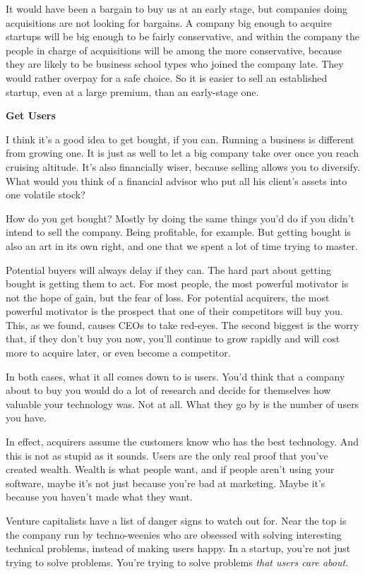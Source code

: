 \documentclass[12pt]{book}
\begin{document}
It would have been a bargain to buy us at an early stage, but companies
doing acquisitions are not looking for bargains. A company big enough to
acquire startups will be big enough to be fairly conservative, and
within the company the people in charge of acquisitions will be among
the more conservative, because they are likely to be business school
types who joined the company late. They would rather overpay for a safe
choice. So it is easier to sell an established startup, even at a large
premium, than an early-stage one.

\textbf{Get Users}

I think it's a good idea to get bought, if you can. Running a business
is different from growing one. It is just as well to let a big company
take over once you reach cruising altitude. It's also financially wiser,
because selling allows you to diversify. What would you think of a
financial advisor who put all his client's assets into one volatile
stock?

How do you get bought? Mostly by doing the same things you'd do if you
didn't intend to sell the company. Being profitable, for example. But
getting bought is also an art in its own right, and one that we spent a
lot of time trying to master.

Potential buyers will always delay if they can. The hard part about
getting bought is getting them to act. For most people, the most
powerful motivator is not the hope of gain, but the fear of loss. For
potential acquirers, the most powerful motivator is the prospect that
one of their competitors will buy you. This, as we found, causes CEOs to
take red-eyes. The second biggest is the worry that, if they don't buy
you now, you'll continue to grow rapidly and will cost more to acquire
later, or even become a competitor.

In both cases, what it all comes down to is users. You'd think that a
company about to buy you would do a lot of research and decide for
themselves how valuable your technology was. Not at all. What they go by
is the number of users you have.

In effect, acquirers assume the customers know who has the best
technology. And this is not as stupid as it sounds. Users are the only
real proof that you've created wealth. Wealth is what people want, and
if people aren't using your software, maybe it's not just because you're
bad at marketing. Maybe it's because you haven't made what they want.

Venture capitalists have a list of danger signs to watch out for. Near
the top is the company run by techno-weenies who are obsessed with
solving interesting technical problems, instead of making users happy.
In a startup, you're not just trying to solve problems. You're trying to
solve problems \emph{that users care about.}
\end{document}
